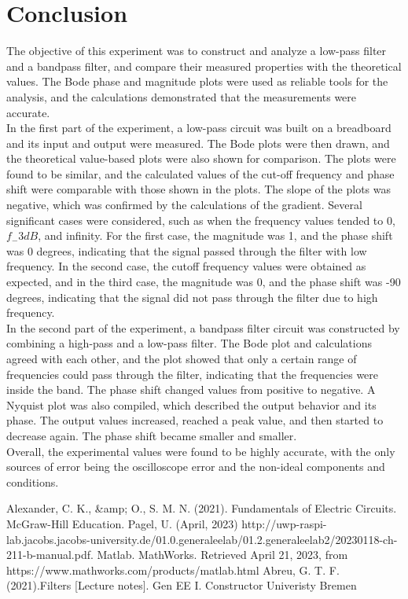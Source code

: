 \documentclass[12pt]{report}
\begin{document}
\chapter{Conclusion}
The objective of this experiment was to construct and analyze a low-pass filter and a bandpass filter, and compare their measured properties with the theoretical values. The Bode phase and magnitude plots were used as reliable tools for the analysis, and the calculations demonstrated that the measurements were accurate.\\
In the first part of the experiment, a low-pass circuit was built on a breadboard and its input and output were measured. The Bode plots were then drawn, and the theoretical value-based plots were also shown for comparison. The plots were found to be similar, and the calculated values of the cut-off frequency and phase shift were comparable with those shown in the plots. The slope of the plots was negative, which was confirmed by the calculations of the gradient. Several significant cases were considered, such as when the frequency values tended to 0, $f_-3dB$, and infinity. For the first case, the magnitude was 1, and the phase shift was 0 degrees, indicating that the signal passed through the filter with low frequency. In the second case, the cutoff frequency values were obtained as expected, and in the third case, the magnitude was 0, and the phase shift was -90 degrees, indicating that the signal did not pass through the filter due to high frequency.\\
In the second part of the experiment, a bandpass filter circuit was constructed by combining a high-pass and a low-pass filter. The Bode plot and calculations agreed with each other, and the plot showed that only a certain range of frequencies could pass through the filter, indicating that the frequencies were inside the band. The phase shift changed values from positive to negative. A Nyquist plot was also compiled, which described the output behavior and its phase. The output values increased, reached a peak value, and then started to decrease again. The phase shift became smaller and smaller.\\
Overall, the experimental values were found to be highly accurate, with the only sources of error being the oscilloscope error and the non-ideal components and conditions.
\setcounter{chapter}{5}
\begin{thebibliography}{9}
Alexander, C. K., \&amp; O., S. M. N. (2021). Fundamentals of Electric Circuits. McGraw-Hill Education.
Pagel, U. (April, 2023) http://uwp-raspi-lab.jacobs.jacobs-university.de/01.0.generaleelab/01.2.generaleelab2/20230118-ch-211-b-manual.pdf.
Matlab. MathWorks. Retrieved April 21, 2023, from https://www.mathworks.com/products/matlab.html 
Abreu, G. T. F. (2021).Filters [Lecture notes]. Gen EE I. Constructor Univeristy Bremen
\end{thebibliography}
\end{document}
